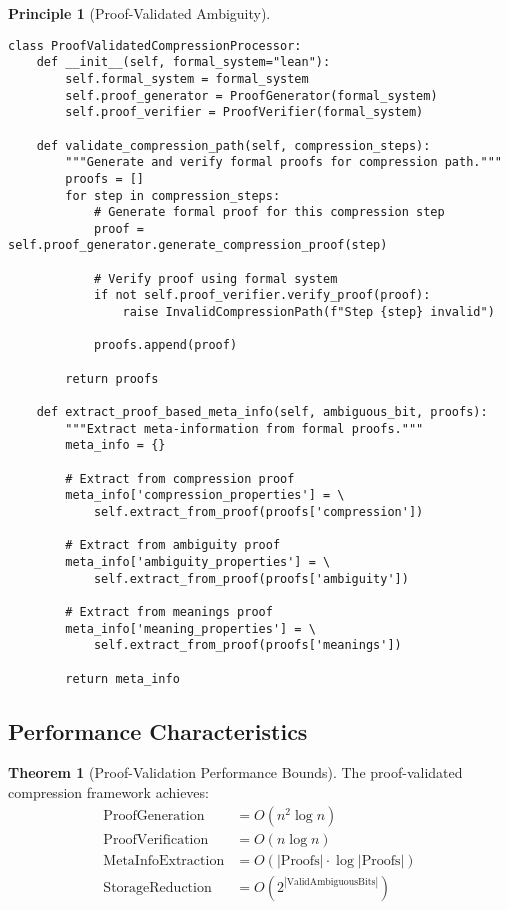 \documentclass[12pt,a4paper]{article}
\theoremstyle{definition}
\newtheorem{theorem}{Theorem}
\newtheorem{principle}{Principle}
\begin{document}
\begin{principle}[Proof-Validated Ambiguity]
\begin{lstlisting}[caption=Python Integration with Formal Proof Systems]
class ProofValidatedCompressionProcessor:
    def __init__(self, formal_system="lean"):
        self.formal_system = formal_system
        self.proof_generator = ProofGenerator(formal_system)
        self.proof_verifier = ProofVerifier(formal_system)
        
    def validate_compression_path(self, compression_steps):
        """Generate and verify formal proofs for compression path."""
        proofs = []
        for step in compression_steps:
            # Generate formal proof for this compression step
            proof = self.proof_generator.generate_compression_proof(step)
            
            # Verify proof using formal system
            if not self.proof_verifier.verify_proof(proof):
                raise InvalidCompressionPath(f"Step {step} invalid")
                
            proofs.append(proof)
        
        return proofs
    
    def extract_proof_based_meta_info(self, ambiguous_bit, proofs):
        """Extract meta-information from formal proofs."""
        meta_info = {}
        
        # Extract from compression proof
        meta_info['compression_properties'] = \
            self.extract_from_proof(proofs['compression'])
            
        # Extract from ambiguity proof  
        meta_info['ambiguity_properties'] = \
            self.extract_from_proof(proofs['ambiguity'])
            
        # Extract from meanings proof
        meta_info['meaning_properties'] = \
            self.extract_from_proof(proofs['meanings'])
            
        return meta_info
\end{lstlisting}

\subsection{Performance Characteristics}

\begin{theorem}[Proof-Validation Performance Bounds]
The proof-validated compression framework achieves:
\begin{align}
\text{ProofGeneration} &= O(n^2 \log n) \\
\text{ProofVerification} &= O(n \log n) \\
\text{MetaInfoExtraction} &= O(|\text{Proofs}| \cdot \log |\text{Proofs}|) \\
\text{StorageReduction} &= O(2^{|\text{ValidAmbiguousBits}|})
\end{align}
\end{theorem}


\end{principle}
\end{document}
